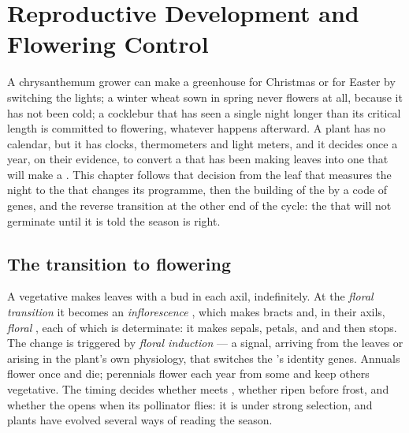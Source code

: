\chapter{Reproductive Development and Flowering Control}\label{ch:b2:plant-flowering}

A chrysanthemum grower can make a greenhouse  for Christmas
or for Easter by switching the lights; a winter wheat sown in
spring never flowers at all, because it has not been cold; a
cocklebur that has seen a single night longer than its critical
length is committed to flowering, whatever happens afterward. A
plant has no calendar, but it has clocks, thermometers and light
meters, and it decides once a year, on their evidence, to convert a
 that has been making leaves into one that will make a
. This chapter follows that decision from the leaf that
measures the night to the  that changes its programme, then
the building of the  by a code of genes, and the reverse
transition at the other end of the cycle: the  that will not
germinate until it is told the season is right.

\section{The transition to flowering}

\begin{definition}\label{def:b2:plant-flowering:transition}
A vegetative  makes leaves with a bud in each
axil, indefinitely. At the \emph{floral transition} it becomes an
\emph{inflorescence }, which makes bracts and, in their
axils, \emph{floral }, each of which is determinate: it
makes sepals, petals,  and  and then stops. The change
is triggered by \emph{floral induction} --- a signal, arriving from
the leaves or arising in the plant's own physiology, that switches
the 's identity genes. Annuals flower once and die;
perennials flower each year from some  and keep others
vegetative. The timing decides whether  meets , whether
 ripen before frost, and whether the  opens when its
pollinator flies: it is under strong selection, and plants have
evolved several ways of reading the season.
\end{definition}

